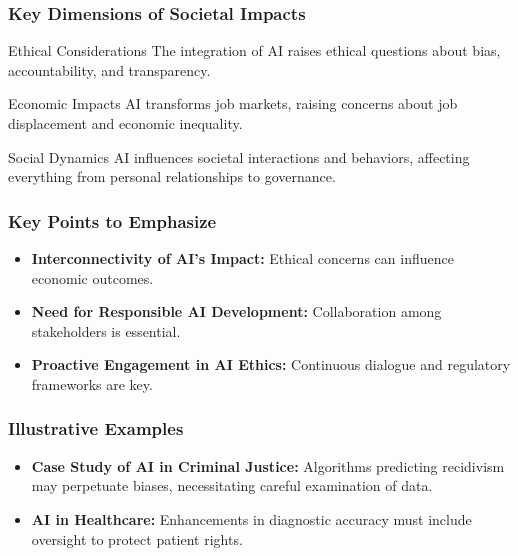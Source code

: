 \documentclass[aspectratio=169]{beamer}
\begin{document}
\begin{frame}[fragile]
    \frametitle{Key Dimensions of Societal Impacts}
    
    \begin{block}{Ethical Considerations}
        The integration of AI raises ethical questions about bias, accountability, and transparency. 
    \end{block}
    
    \begin{block}{Economic Impacts}
        AI transforms job markets, raising concerns about job displacement and economic inequality.
    \end{block}
    
    \begin{block}{Social Dynamics}
        AI influences societal interactions and behaviors, affecting everything from personal relationships to governance.
    \end{block}
\end{frame}

\begin{frame}[fragile]
    \frametitle{Key Points to Emphasize}
    
    \begin{itemize}
        \item \textbf{Interconnectivity of AI's Impact:} 
            Ethical concerns can influence economic outcomes.
        \item \textbf{Need for Responsible AI Development:} 
            Collaboration among stakeholders is essential.
        \item \textbf{Proactive Engagement in AI Ethics:} 
            Continuous dialogue and regulatory frameworks are key.
    \end{itemize}
\end{frame}

\begin{frame}[fragile]
    \frametitle{Illustrative Examples}
    
    \begin{itemize}
        \item \textbf{Case Study of AI in Criminal Justice:} 
            Algorithms predicting recidivism may perpetuate biases, necessitating careful examination of data.
        \item \textbf{AI in Healthcare:} 
            Enhancements in diagnostic accuracy must include oversight to protect patient rights.
    \end{itemize}
\end{frame}
\end{document}

